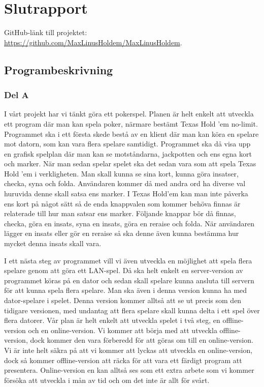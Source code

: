 \documentclass[10pt,a4paper]{article}
\begin{document}
\section*{Slutrapport}

GitHub-länk till projektet:
\url{https://github.com/MaxLinusHoldem/MaxLinusHoldem}.

\subsection*{Programbeskrivning}

\subsubsection*{Del A}

I vårt projekt har vi tänkt göra ett pokerspel. Planen är helt enkelt att
utveckla ett program där man kan spela poker, närmare bestämt Texas Hold
’em no-limit. Programmet ska i ett första skede bestå av en klient där man
kan köra en spelare mot datorn, som kan vara flera spelare samtidigt.
Programmet ska då visa upp en grafisk spelplan där man kan se motståndarna,
jackpotten och ens egna kort och marker. När man sedan spelar spelet ska
det sedan vara som att spela Texas Hold ’em i verkligheten. Man skall kunna
se sina kort, kunna göra insatser, checka, syna och folda. Användaren
kommer då med andra ord ha diverse val huruvida denne skall satsa ens
marker. I Texas Hold’em kan man inte påverka ens kort på något sätt så de
enda knappvalen som kommer behöva finnas är relaterade till hur man satsar
ens marker. Följande knappar bör då finnas, checka, göra en insats, syna en
insats, göra en reraise och folda. När användaren lägger en insats eller
gör en reraise så ska denne även kunna bestämma hur mycket denna insats
skall vara.

I ett nästa steg av programmet vill vi även utveckla en möjlighet att spela
flera spelare genom att göra ett LAN-spel. Då ska helt enkelt en
server-version av programmet köras på en dator och sedan skall spelare
kunna ansluta till servern för att kunna spela flera spelare. Man ska även
i denna version kunna ha med dator-spelare i spelet. Denna version kommer
alltså att se ut precis som den tidigare versionen, med undantag att flera
spelare skall kunna delta i ett spel över flera datorer. Vår plan är helt
enkelt att utveckla spelet i två steg, en offline-version och en
online-version. Vi kommer att börja med att utveckla offline-version, dock
kommer den vara förberedd för att göras om till en online-version. Vi är
inte helt säkra på att vi kommer att lyckas att utveckla en online-version,
dock så kommer offline-version att räcka för att vara ett färdigt program
att presentera. Online-version en kan alltså ses som ett extra arbete som
vi kommer försöka att utveckla i mån av tid och om det inte är allt för
svårt.
\end{document}
